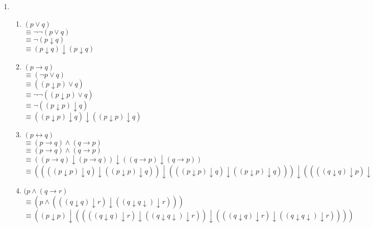 \documentclass{article}
\begin{document}
\begin{enumerate}[label=(\alph*)]
    \item 
    \begin{enumerate}[label=\roman*.]
        \item 
        \quad $(p\lor{}q)$ \\
        \quad $\equiv{} \neg{}\neg{}(p\lor{}q)$ \\
        \quad $\equiv{} \neg{}(p\downarrow{}q)$ \\
        \quad $\equiv{} (p\downarrow{}q)\downarrow{}(p\downarrow{}q)$ \\
        
        \item
        \quad $(p\rightarrow{}q)$ \\
        \quad $\equiv{} (\neg{}p\lor{}q)$ \\
        \quad $\equiv{} ((p\downarrow{}p)\lor{}q)$ \\
        \quad $\equiv{} \neg{}\neg{}((p\downarrow{}p)\lor{}q)$ \\
        \quad $\equiv{} \neg{}((p\downarrow{}p)\downarrow{}q)$ \\
        \quad $\equiv{} ((p\downarrow{}p)\downarrow{}q)\downarrow{}((p\downarrow{}p)\downarrow{}q)$ \\
        
        \item
        \quad $(p\leftrightarrow{}q)$ \\
        \quad $\equiv{} (p\rightarrow{}q)\land(q\rightarrow{}p)$ \\
        \quad $\equiv{} (p\rightarrow{}q)\land(q\rightarrow{}p)$ \\
        \quad $\equiv{} ((p\rightarrow{}q)\downarrow{}(p\rightarrow{}q))\downarrow{}((q\rightarrow{}p)\downarrow{}(q\rightarrow{}p))$ \\
        \quad $\equiv{} ((((p\downarrow{}p)\downarrow{}q)\downarrow{}((p\downarrow{}p)\downarrow{}q))\downarrow{}(((p\downarrow{}p)\downarrow{}q)\downarrow{}((p\downarrow{}p)\downarrow{}q)))\downarrow{}((((q\downarrow{}q)\downarrow{}p)\downarrow{}((q\downarrow{}q)\downarrow{}p))\downarrow{}(((q\downarrow{}q)\downarrow{}p)\downarrow{}((q\downarrow{}q)\downarrow{}p)))$
        
        \item 
        \quad $(p\land{}(q\rightarrow{}r)$ \\
        \quad $\equiv{} (p\land{}(((q\downarrow{}q)\downarrow{}r)\downarrow{}((q\downarrow{}q\downarrow{})\downarrow{}r)))$ \\
        \quad $\equiv{} ((p\downarrow{}p)\downarrow{}((((q\downarrow{}q)\downarrow{}r)\downarrow{}((q\downarrow{}q\downarrow{})\downarrow{}r))\downarrow{}(((q\downarrow{}q)\downarrow{}r)\downarrow{}((q\downarrow{}q\downarrow{})\downarrow{}r))))$ \\
        

\end{enumerate}
\end{enumerate}
\end{document}

